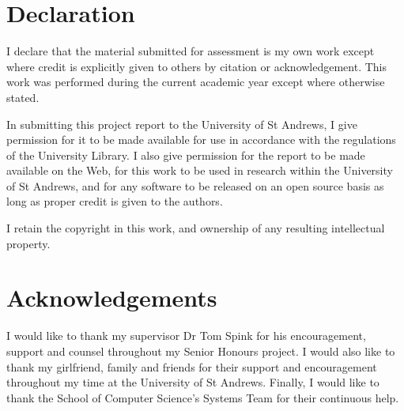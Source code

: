 \chapter*{Declaration}
I declare that the material submitted for assessment is my own work except
where credit is explicitly given to others by citation or acknowledgement. This
work was performed during the current academic year except where otherwise
stated.

In submitting this project report to the University of St Andrews, I give
permission for it to be made available for use in accordance with the
regulations of the University Library. I also give permission for the report to
be made available on the Web, for this work to be used in research within the
University of St Andrews, and for any software to be released on an open source
basis as long as proper credit is given to the authors.


I retain the copyright in this work, and ownership of any resulting intellectual property.

{\let\clearpage\relax \chapter*{Acknowledgements}}
I would like to thank my supervisor Dr Tom Spink for his
encouragement, support and counsel throughout my Senior Honours project. I
would also like to thank my girlfriend, family and friends for their support and
encouragement throughout my time at the University of St Andrews. Finally, I would like to thank the School
of Computer Science's Systems Team for their continuous help.

